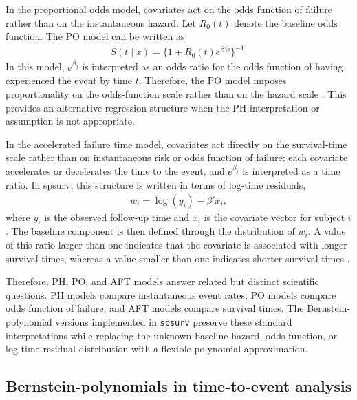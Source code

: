 \documentclass[5p,lefttitle]{elsarticle}
\providecommand{\pkg}[1]{\textsf{#1}}
\begin{document}
In the proportional odds model, covariates act on the odds function of
failure rather than on the instantaneous hazard. Let \(R_0(t)\) denote the
baseline odds function. The PO model can be written as
{\begin{align}
S(t \mid x) = \{1 + R_0(t)e^{\beta'x}\}^{-1}.
\end{align}\normalsize}
In this model, \(e^{\beta_j}\) is interpreted as an odds ratio for the
odds function of having experienced the event by time \(t\). Therefore, the
PO model imposes proportionality on the odds-function scale rather than on
the hazard scale \citep{Bennett:1983}. This provides an alternative regression
structure when the PH interpretation or assumption is not appropriate.

In the accelerated failure time model, covariates act directly on the
survival-time scale rather than on instantaneous risk or odds function of
failure: each covariate accelerates or decelerates the time to the event, and
\(e^{\beta_j}\) is interpreted as a time ratio. In \pkg{spsurv}, this structure
is written in terms of log-time residuals,
{\begin{align}
w_i = \log(y_i) - \beta'x_i,
\end{align}\normalsize}
where \(y_i\) is the observed follow-up time and \(x_i\) is the covariate
vector for subject \(i\). The baseline component is then defined through the
distribution of \(w_i\). A value of this ratio larger than one indicates that
the covariate is associated with longer survival times, whereas a value
smaller than one indicates shorter survival times
\citep{Prentice:1973,kalbfleisch2002statistical}.

Therefore, PH, PO, and AFT models answer related but distinct scientific
questions. PH models compare instantaneous event rates, PO models compare
odds function of failure, and AFT models compare survival times. The
Bernstein-polynomial versions implemented in \texttt{spsurv} preserve these
standard interpretations while replacing the unknown baseline hazard,
odds function, or log-time residual distribution with a flexible polynomial
approximation.

\subsection{Bernstein-polynomials in time-to-event analysis}\label{bernstein-polynomials-in-time-to-event-analysis}
\end{document}
